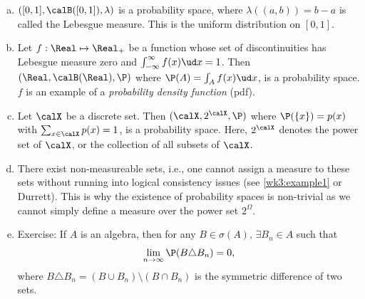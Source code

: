 \documentclass[../aipt.tex]{subfiles}
\begin{document}
\begin{enumerate}[(a)]
	\item $([0,1],\calB([0,1]),\lambda)$ is a probability space, where $\lambda((a,b)) = b-a$ is called the Lebesgue measure. This is the uniform distribution on $[0,1]$.
	\item Let $f: \Real\mapsto\Real_+$ be a function whose set of discontinuities has Lebesgue measure zero and $\int_{-\infty}^\infty f(x) \ud x=1$. Then $(\Real, \calB(\Real), \P)$ where $\P(A) = \int_A f(x) \ud x$, is a probability space. $f$ is an example of a \emph{probability density function} (pdf).
	\item Let $\calX$ be a discrete set. Then $(\calX, 2^\calX, \P)$ where $\P(\{x\}) = p(x)$ with $\sum_{x\in\calX} p(x) =1$, is a probability space. Here, $2^\calX$ denotes the power set of $\calX$, or the collection of all subsets of $\calX$.
	\item There exist non-measureable sets, i.e., one cannot assign a measure to these sets without running into logical consistency issues (see \cref{wk3:example1} or Durrett). This is why the existence of probability spaces is non-trivial as we cannot simply define a measure over the power set $2^\Omega$. 
	\item Exercise: If $A$ is an algebra, then for any $B\in\sigma(A)$, $\exists B_n\in A$ such that 
	\begin{align*}
	\lim_{n\to\infty} \P(B\triangle B_n) = 0,
	\end{align*}
	where $B\triangle B_n = (B\cup B_n)\setminus(B\cap B_n)$ is the symmetric difference of two sets.
\end{enumerate}

%

\end{document}
